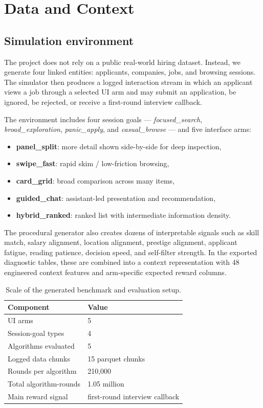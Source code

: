 \documentclass[10pt,twocolumn]{article}
\begin{document}
\section{Data and Context}
\subsection{Simulation environment}
The project does not rely on a public real-world hiring dataset. Instead, we generate four linked entities: applicants, companies, jobs, and browsing sessions. The simulator then produces a logged interaction stream in which an applicant views a job through a selected UI arm and may submit an application, be ignored, be rejected, or receive a first-round interview callback.

The environment includes four session goals --- \textit{focused\_search}, \textit{broad\_exploration}, \textit{panic\_apply}, and \textit{casual\_browse} --- and five interface arms:
\begin{itemize}
    \item \textbf{panel\_split}: more detail shown side-by-side for deep inspection,
    \item \textbf{swipe\_fast}: rapid skim / low-friction browsing,
    \item \textbf{card\_grid}: broad comparison across many items,
    \item \textbf{guided\_chat}: assistant-led presentation and recommendation,
    \item \textbf{hybrid\_ranked}: ranked list with intermediate information density.
\end{itemize}

The procedural generator also creates dozens of interpretable signals such as skill match, salary alignment, location alignment, prestige alignment, applicant fatigue, reading patience, decision speed, and self-filter strength. In the exported diagnostic tables, these are combined into a context representation with 48 engineered context features and arm-specific expected reward columns.

\begin{table}[H]
\centering
\caption{Scale of the generated benchmark and evaluation setup.}
\label{tab:setup}
\small
\begin{tabular}{p{}p{}}
\toprule
Component & Value \\
\midrule
UI arms & 5 \\
Session-goal types & 4 \\
Algorithms evaluated & 5 \\
Logged data chunks & 15 parquet chunks \\
Rounds per algorithm & 210{,}000 \\
Total algorithm-rounds & 1.05 million \\
Main reward signal & first-round interview callback \\
\bottomrule
\end{tabular}
\end{table}
\end{document}
